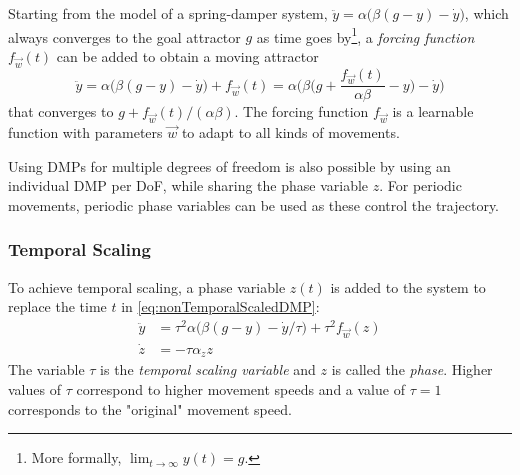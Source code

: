 			Starting from the model of a spring-damper system, \( \ddot{y} = \alpha \big( \beta (g - y) - \dot{y} \big) \), which always converges to the goal attractor \(g\) as time goes by\footnote{More formally, \( \lim_{t \to \infty} y(t) = g \).}, a \emph{forcing function} \( f_{\vec{w}}(t) \) can be added to obtain a moving attractor
			\begin{equation}
				\ddot{y} = \alpha \big( \beta (g - y) - \dot{y} \big) + f_{\vec{w}}(t) = \alpha \Bigg(\! \beta \bigg(\! g + \frac{f_{\vec{w}}(t)}{\alpha \beta} - y \!\bigg) - \dot{y} \!\Bigg)  \label{eq:nonTemporalScaledDMP}
			\end{equation}
			that converges to \( g + f_{\vec{w}}(t) / (\alpha \beta) \). The forcing function \( f_{\vec{w}} \) is a learnable function with parameters \(\vec{w}\) to adapt to all kinds of movements.

			Using DMPs for multiple degrees of freedom is also possible by using an individual DMP per DoF, while sharing the phase variable \(z\). For periodic movements, periodic phase variables can be used as these control the trajectory.

			\subsubsection{Temporal Scaling}
				To achieve temporal scaling, a phase variable \( z(t) \) is added to the system to replace the time \(t\) in \eqref{eq:nonTemporalScaledDMP}:
				\begin{align*}
					\ddot{y} & = \tau^2 \alpha \big( \beta (g - y) - \dot{y} / \tau \big) + \tau^2 f_{\vec{w}}(z) \\
					\dot{z}  & = -\tau \alpha_z z
				\end{align*}
				The variable \(\tau\) is the \emph{temporal scaling variable} and \(z\) is called the \emph{phase}. Higher values of \(\tau\) correspond to higher movement speeds and a value of \( \tau = 1 \) corresponds to the "original" movement speed.

